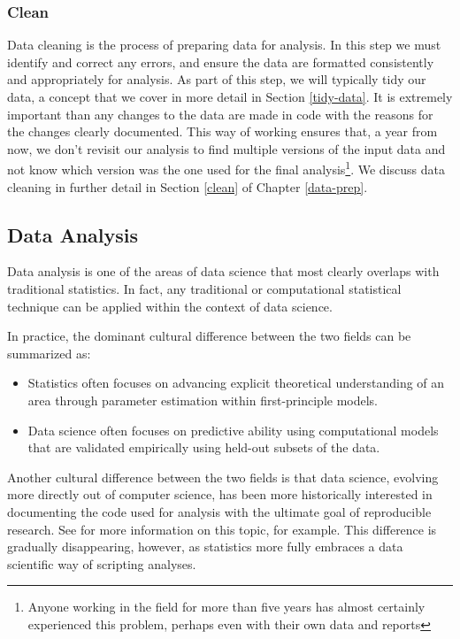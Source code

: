 \documentclass[
]{book}
\providecommand{\tightlist}{%
  \setlength{\itemsep}{0pt}\setlength{\parskip}{0pt}}
\begin{document}
\hypertarget{clean_2}{%
\subsubsection{Clean}\label{clean_2}}

Data cleaning is the process of preparing data for analysis. In this step we must identify and correct any errors, and ensure the data are formatted consistently and appropriately for analysis. As part of this step, we will typically tidy our data, a concept that we cover in more detail in Section \ref{tidy-data}. It is extremely important than any changes to the data are made in code with the reasons for the changes clearly documented. This way of working ensures that, a year from now, we don't revisit our analysis to find multiple versions of the input data and not know which version was the one used for the final analysis\footnote{Anyone working in the field for more than five years has almost certainly experienced this problem, perhaps even with their own data and reports}. We discuss data cleaning in further detail in Section \ref{clean} of Chapter \ref{data-prep}.

\hypertarget{data-analysis2}{%
\subsection{Data Analysis}\label{data-analysis2}}

Data analysis is one of the areas of data science that most clearly overlaps with traditional statistics. In fact, any traditional or computational statistical technique can be applied within the context of data science.

In practice, the dominant cultural difference between the two fields can be summarized as:

\begin{itemize}
\tightlist
\item
  Statistics often focuses on advancing explicit theoretical understanding of an area through parameter estimation within first-principle models.
\item
  Data science often focuses on predictive ability using computational models that are validated empirically using held-out subsets of the data.
\end{itemize}

Another cultural difference between the two fields is that data science, evolving more directly out of computer science, has been more historically interested in documenting the code used for analysis with the ultimate goal of reproducible research. See \citet{Peng2011} for more information on this topic, for example. This difference is gradually disappearing, however, as statistics more fully embraces a data scientific way of scripting analyses.
\end{document}
